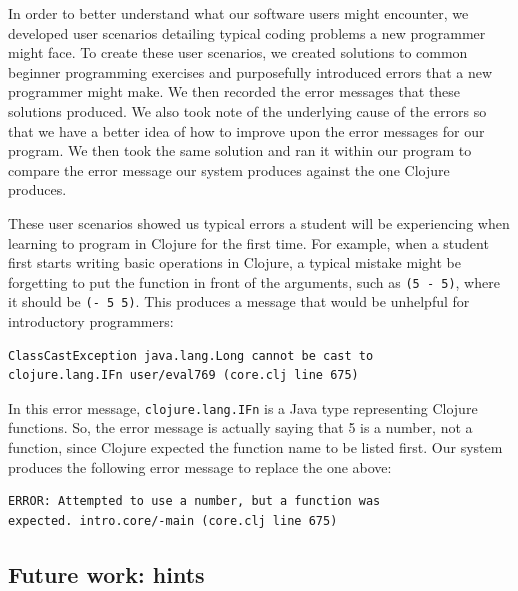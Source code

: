 \documentclass[12pt]{article}
\newcommand{\comment}[1]{{\bf \tt  {#1}}}
\newcommand{\emcomment}[1]{\textcolor{ForestGreen}{\comment{Elena: {#1}}}}
\begin{document}
In order to better understand what our software users might encounter, we developed user scenarios detailing typical coding 
problems a new programmer might face.
To create these user scenarios, we created solutions to common beginner programming exercises and purposefully introduced errors 
that a new programmer might make.
We then recorded the error messages that these solutions produced.
We also took note of the underlying cause of the errors so that we have a better idea of how to improve upon the error messages 
for our program.
We then took the same solution and ran it within our program to compare the error message our system produces against the one 
Clojure produces.

These user scenarios showed us typical errors a student will be experiencing when learning to program in Clojure for the first 
time.
For example, when a student first starts writing basic operations in Clojure, a typical mistake might be forgetting to put the 
function in front of the arguments,
such as \texttt{(5 - 5)}, where it should be \texttt{(- 5 5)}. 
This produces a message that would be unhelpful for introductory programmers: 

\begin{verbatim}
ClassCastException java.lang.Long cannot be cast to
clojure.lang.IFn user/eval769 (core.clj line 675)
\end{verbatim}

In this error message, \texttt{clojure.lang.IFn} is a Java type representing Clojure functions. So, the error message is 
actually saying that 5 is a number, not a function, since Clojure expected the function name to be listed first. Our system 
produces the following error message to replace the one above:

\begin{verbatim}
ERROR: Attempted to use a number, but a function was
expected. intro.core/-main (core.clj line 675)
\end{verbatim}


\subsection{Future work: hints}\label{sec:hints}
\end{document}
